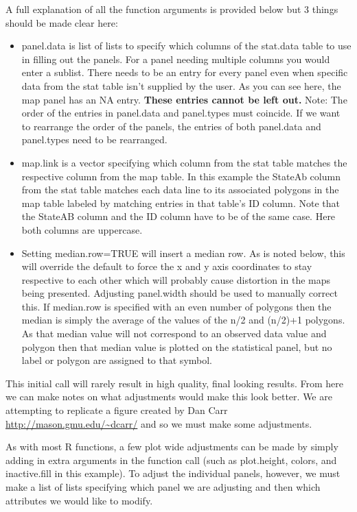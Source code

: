 \documentclass{article}
\begin{document}
A full explanation of all the function arguments is
provided below but 3 things should be made clear here:
\begin{itemize}
  \item panel.data is list of lists to specify which columns of the stat.data table to use in filling out the panels. For a panel needing multiple columns you would enter a sublist. There needs to be an entry for every panel even when specific data from the stat table isn't supplied by the user. As you can see here, the map panel has an NA entry. \textbf{These entries cannot be left out.} Note: The order of the entries in panel.data and panel.types must coincide. If we want to rearrange the order of the panels, the entries of both panel.data and panel.types need to be rearranged.
  \item map.link is a vector specifying which column from the stat table matches the respective column from the map table. In this example the StateAb column from the stat table matches each data line to its associated polygons in the map table labeled by matching entries in that table's ID column. Note that the StateAB column and the ID column have to be of the same case. Here both columns are uppercase.
  \item Setting median.row=TRUE will insert a median row. As is noted below, this will override the default to force the x and y axis coordinates to stay respective to each other which will probably cause distortion in the maps being presented. Adjusting panel.width should be used to manually correct this. If median.row is specified with an even number of polygons then the median is simply the average of the values of the n/2 and (n/2)+1 polygons.  As that median value will not correspond to an observed data value and polygon then that median value is plotted on the statistical panel, but no label or polygon are assigned to that symbol.
\end{itemize}

This initial call will rarely result in high quality, final looking results. From here we can make notes on what adjustments would make this look better. We are attempting to replicate a figure created by Dan Carr
\url{http://mason.gmu.edu/~dcarr/} and so we must make some adjustments.

As with most R functions, a few plot wide adjustments can be made by simply adding in extra arguments in the function call (such as plot.height, colors, and inactive.fill in this example). To adjust the individual panels, however, we must make a list of lists specifying which panel we are adjusting and then which attributes we would like to modify.
\end{document}
